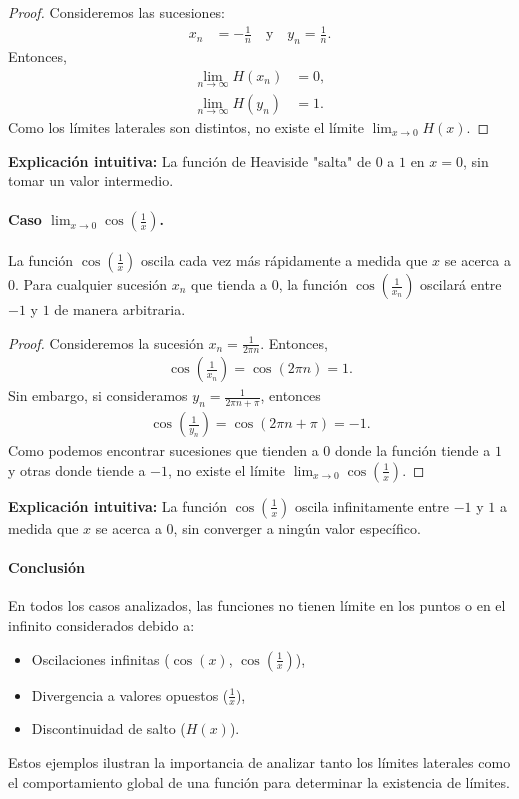 \documentclass[12pt, a4paper]{article}
\theoremstyle{rioplatense}
\begin{document}
\begin{proof}
Consideremos las sucesiones:
\begin{align*}
    x_n &= -\frac{1}{n} \quad \text{y} \quad y_n = \frac{1}{n}.
\end{align*}
Entonces,
\begin{align*}
    \lim_{n \to \infty} H(x_n) &= 0, \\
    \lim_{n \to \infty} H(y_n) &= 1.
\end{align*}
Como los límites laterales son distintos, no existe el límite \(\lim_{x \to 0} H(x)\).
\end{proof}

\textbf{Explicación intuitiva:} La función de Heaviside "salta" de \(0\) a \(1\) en \(x = 0\), sin tomar un valor intermedio.

\paragraph{Caso \(\lim_{x \to 0} \cos\left(\frac{1}{x}\right)\).}
La función \(\cos\left(\frac{1}{x}\right)\) oscila cada vez más rápidamente a medida que \(x\) se acerca a \(0\). Para cualquier sucesión \(x_n\) que tienda a \(0\), la función \(\cos\left(\frac{1}{x_n}\right)\) oscilará entre \(-1\) y \(1\) de manera arbitraria.

\begin{proof}
Consideremos la sucesión \(x_n = \frac{1}{2\pi n}\). Entonces,
\begin{align*}
    \cos\left(\frac{1}{x_n}\right) = \cos(2\pi n) = 1.
\end{align*}
Sin embargo, si consideramos \(y_n = \frac{1}{2\pi n + \pi}\), entonces
\begin{align*}
    \cos\left(\frac{1}{y_n}\right) = \cos(2\pi n + \pi) = -1.
\end{align*}
Como podemos encontrar sucesiones que tienden a \(0\) donde la función tiende a \(1\) y otras donde tiende a \(-1\), no existe el límite \(\lim_{x \to 0} \cos\left(\frac{1}{x}\right)\).
\end{proof}

\textbf{Explicación intuitiva:} La función \(\cos\left(\frac{1}{x}\right)\) oscila infinitamente entre \(-1\) y \(1\) a medida que \(x\) se acerca a \(0\), sin converger a ningún valor específico.

\paragraph{Conclusión}
En todos los casos analizados, las funciones no tienen límite en los puntos o en el infinito considerados debido a:
\begin{itemize}
    \item Oscilaciones infinitas (\(\cos(x)\), \(\cos\left(\frac{1}{x}\right)\)),
    \item Divergencia a valores opuestos (\(\frac{1}{x}\)),
    \item Discontinuidad de salto (\(H(x)\)).
\end{itemize}
Estos ejemplos ilustran la importancia de analizar tanto los límites laterales como el comportamiento global de una función para determinar la existencia de límites.
\end{document}
